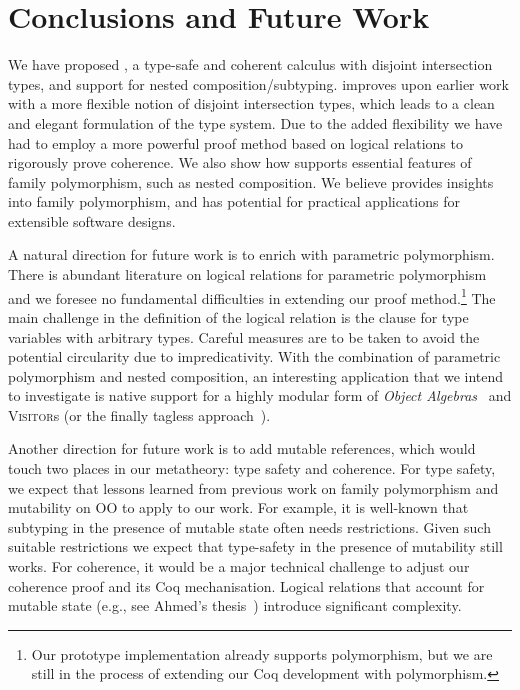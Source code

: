 
\section{Conclusions and Future Work}
\label{sec:conclusion}

We have proposed \name, a type-safe and coherent calculus with disjoint
intersection types, and support for nested composition/subtyping. \name
improves upon earlier work with a more
flexible notion of disjoint intersection types, which leads to
a clean and elegant formulation of the type system. Due to the added
flexibility we have had to employ a more powerful proof method based on logical
relations to rigorously prove coherence.
We also show how \name supports essential features of family
polymorphism, such as nested composition. We believe \name provides insights into family polymorphism, and
has potential for practical applications for extensible software designs.

A natural direction for future work is to enrich \name with parametric
polymorphism. There is abundant literature on logical relations for parametric
polymorphism~\cite{reynolds1983types} and we foresee no fundamental difficulties
in extending our proof method.\footnote{ Our prototype implementation already
  supports polymorphism, but we are still in the process of extending our Coq
  development with polymorphism.} The main challenge in the definition of the
logical relation is the clause for type variables with arbitrary types. Careful
measures are to be taken to avoid the potential circularity due to
impredicativity. With the combination of parametric polymorphism and nested
composition, an interesting application that we intend to investigate is native
support for a highly modular form of \textit{Object Algebras}~\cite{oliveira2012extensibility, xuan_traits} and \textsc{Visitor}s
(or the finally tagless approach~\cite{CARETTE_2009}).

Another direction for future work is to add mutable references, which would
touch two places in our metatheory: type safety and coherence. For type safety,
we expect that lessons learned from previous work on family polymorphism and
mutability on OO to apply to our work. For example, it is well-known that
subtyping in the presence of mutable state often needs restrictions. Given such
suitable restrictions we expect that type-safety in the presence of mutability
still works. For coherence, it would be a major technical challenge to adjust
our coherence proof and its Coq mechanisation. Logical relations that account
for mutable state (e.g., see Ahmed's thesis~\cite{ahmed2004semantics}) introduce significant complexity.





